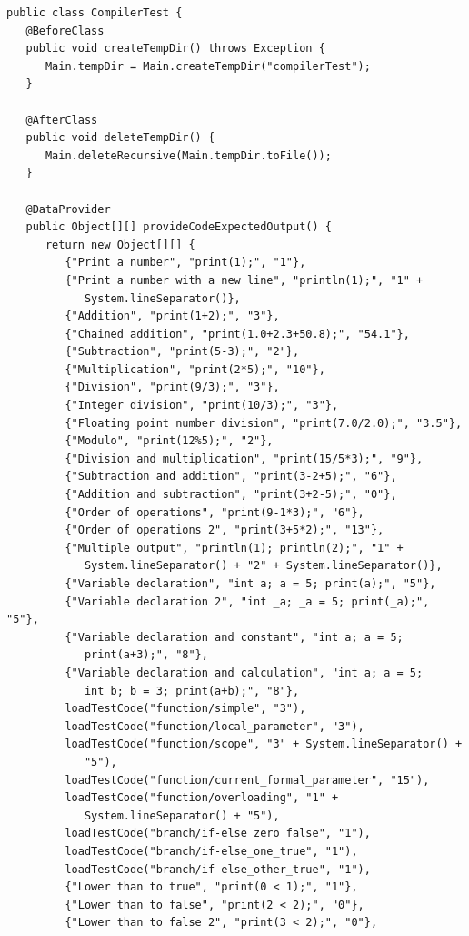 \begin{lstlisting}[frame=htrbl, caption={Implementation of {\ttfamily CompilerTest.java}}, label={lst:compiler_test}, basicstyle=\footnotesize]
public class CompilerTest {
   @BeforeClass
   public void createTempDir() throws Exception {
      Main.tempDir = Main.createTempDir("compilerTest");
   }

   @AfterClass
   public void deleteTempDir() {
      Main.deleteRecursive(Main.tempDir.toFile());
   }

   @DataProvider
   public Object[][] provideCodeExpectedOutput() {
      return new Object[][] {
         {"Print a number", "print(1);", "1"},
         {"Print a number with a new line", "println(1);", "1" + 
            System.lineSeparator()},
         {"Addition", "print(1+2);", "3"},
         {"Chained addition", "print(1.0+2.3+50.8);", "54.1"},
         {"Subtraction", "print(5-3);", "2"},
         {"Multiplication", "print(2*5);", "10"},
         {"Division", "print(9/3);", "3"},
         {"Integer division", "print(10/3);", "3"},
         {"Floating point number division", "print(7.0/2.0);", "3.5"},
         {"Modulo", "print(12%5);", "2"},
         {"Division and multiplication", "print(15/5*3);", "9"},
         {"Subtraction and addition", "print(3-2+5);", "6"},
         {"Addition and subtraction", "print(3+2-5);", "0"},
         {"Order of operations", "print(9-1*3);", "6"},
         {"Order of operations 2", "print(3+5*2);", "13"},
         {"Multiple output", "println(1); println(2);", "1" + 
            System.lineSeparator() + "2" + System.lineSeparator()},
         {"Variable declaration", "int a; a = 5; print(a);", "5"},
         {"Variable declaration 2", "int _a; _a = 5; print(_a);", "5"},
         {"Variable declaration and constant", "int a; a = 5; 
            print(a+3);", "8"},
         {"Variable declaration and calculation", "int a; a = 5; 
            int b; b = 3; print(a+b);", "8"},
         loadTestCode("function/simple", "3"),
         loadTestCode("function/local_parameter", "3"),
         loadTestCode("function/scope", "3" + System.lineSeparator() + 
            "5"),
         loadTestCode("function/current_formal_parameter", "15"),
         loadTestCode("function/overloading", "1" + 
            System.lineSeparator() + "5"),
         loadTestCode("branch/if-else_zero_false", "1"),
         loadTestCode("branch/if-else_one_true", "1"),
         loadTestCode("branch/if-else_other_true", "1"),
         {"Lower than to true", "print(0 < 1);", "1"},
         {"Lower than to false", "print(2 < 2);", "0"},
         {"Lower than to false 2", "print(3 < 2);", "0"},

\end{lstlisting}
